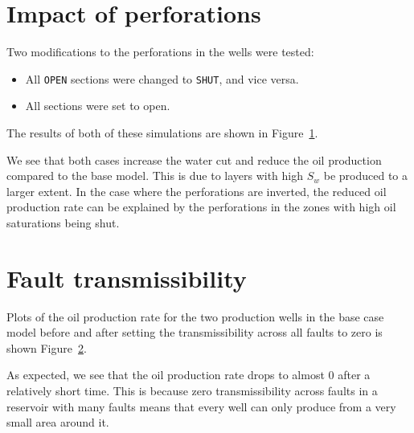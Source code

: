 \documentclass[final]{beamer}
\begin{document}
\begin{frame}[t]
\begin{multicols}{3}
\section{Impact of perforations}
Two modifications to the perforations in the wells were tested:
\begin{itemize}
  \item All \texttt{OPEN} sections were changed to \texttt{SHUT}, and vice versa.
  \item All sections were set to open.
\end{itemize}
The results of both of these simulations are shown in Figure~\ref{fig:perfs_wopt_wwct}.

\begin{figure}[H]
  \centering
  
  \caption{}
  \label{fig:perfs_wopt_wwct}
\end{figure}

We see that both cases increase the water cut and reduce the oil production compared to the base model. This is due to layers with high $S_w$ be produced to a larger extent. In the case where the perforations are inverted, the reduced oil production rate can be explained by the perforations in the zones with high oil saturations being shut.








\section{Fault transmissibility}
Plots of the oil production rate for the two production wells in the base case model before and after setting the transmissibility across all faults to zero is shown Figure~\ref{fig:faults_opr}.

As expected, we see that the oil production rate drops to almost 0 after a relatively short time. This is because zero transmissibility across faults in a reservoir with many faults means that every well can only produce from a very small area around it.

\begin{figure}[ht]
  \hspace{-10ex}
  \caption{}
  \label{fig:faults_opr}
\end{figure}


\end{multicols}
\end{frame}
\end{document}
